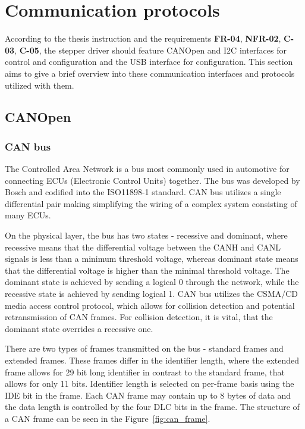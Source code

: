 \section{Communication protocols}
\label{sec:comm_protocols}
According to the thesis instruction and the requirements \textbf{FR-04}, \textbf{NFR-02}, \textbf{C-03}, \textbf{C-05},  the stepper driver should feature CANOpen and I2C interfaces for control and configuration and the USB interface for configuration.
This section aims to give a brief overview into these communication interfaces and protocols utilized with them.

\subsection{CANOpen}
\label{subsec:canopen}



\subsubsection{CAN bus}
The Controlled Area Network is a bus most commonly used in automotive for connecting ECUs (Electronic Control Units) together.
The bus was developed by Bosch and codified into the ISO11898-1 standard\cite{}.
CAN bus utilizes a single differential pair making simplifying the wiring of a complex system consisting of many ECUs.

On the physical layer, the bus has two states - recessive and dominant, where recessive means that the differential voltage between the CANH and CANL signals is less than a minimum threshold voltage, whereas dominant state means that the differential voltage is higher than the minimal threshold voltage.
The dominant state is achieved by sending a logical 0 through the network, while the recessive state is achieved by sending logical 1.
CAN bus utilizes the CSMA/CD media access control protocol, which allows for collision detection and potential retransmission of CAN frames.
For collision detection, it is vital, that the dominant state overrides a recessive one.

There are two types of frames transmitted on the bus - standard frames and extended frames.
These frames differ in the identifier length, where the extended frame allows for 29 bit long identifier in contrast to the standard frame, that allows for only 11 bits.
Identifier length is selected on per-frame basis using the IDE bit in the frame.
Each CAN frame may contain up to 8 bytes of data and the data length is controlled by the four DLC bits in the frame.
The structure of a CAN frame can be seen in the Figure~\ref{fig:can_frame}.

